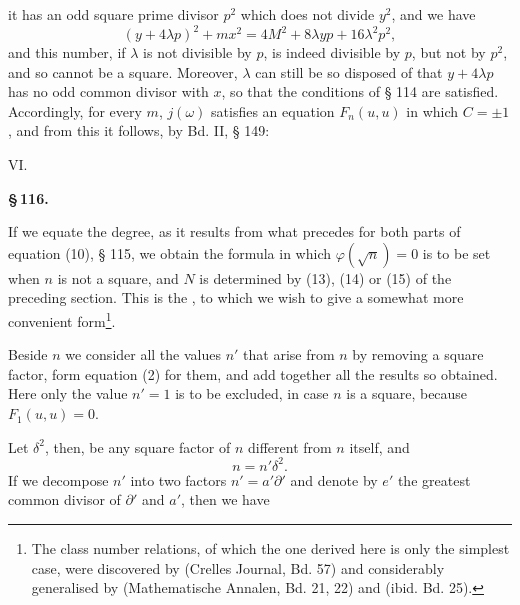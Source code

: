 it has an odd square prime divisor $p^2$ which does not divide $y^2$, and
we have
\[
(y+4\lambda p)^2 + m x^2 = 4M^2 + 8\lambda y p + 16\lambda^2 p^2,
\]
and this number, if $\lambda$ is not divisible by $p$, is indeed divisible
by $p$, but not by $p^2$, and so cannot be a square. Moreover, $\lambda$
can still be so disposed of that $y+4\lambda p$ has no odd common divisor
with $x$, so that the conditions of § 114 are satisfied. Accordingly, for
every $m$, $j(\omega)$ satisfies an equation $F_n(u,u)$ in which $C=\pm 1$,
and from this it follows, by Bd. II, § 149:

VI.  %

\begin{center}
\textbf{\S\,116. }
\end{center}

If we equate the degree, as it results from what precedes for both parts of
equation (10), § 115, we obtain the formula
in which $\varphi(\sqrt{n})=0$ is to be set when $n$ is not a square, and
$N$ is determined by (13), (14) or (15) of the preceding section.
This is the , to which we wish to give a
somewhat more convenient form\footnote{The class number relations, of
which the one derived here is only the simplest case, were discovered by
 (Crelles Journal, Bd. 57) and considerably
generalised by  (Mathematische Annalen, Bd. 21, 22) and
 (ibid. Bd. 25).}.

Beside $n$ we consider all the values $n'$ that arise from $n$ by removing
a square factor, form equation (2) for them, and add together all the
results so obtained. Here only the value $n'=1$ is to be excluded, in case
$n$ is a square, because $F_1(u,u)=0$.

Let $\delta^2$, then, be any square factor of $n$ different from $n$
itself, and
\[
n = n'\delta^2.
\]
If we decompose $n'$ into two factors $n' = a'\partial'$ and denote by
$e'$ the greatest common divisor of $\partial'$ and $a'$, then we have
